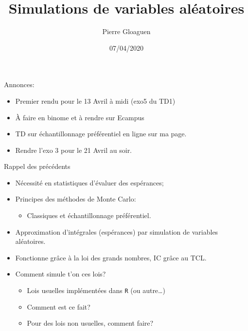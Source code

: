 \documentclass[ignorenonframetext,]{beamer}
\title{Simulations de variables aléatoires}
\author{Pierre Gloaguen}
\date{07/04/2020}
\providecommand{\tightlist}{%
  \setlength{\itemsep}{0pt}\setlength{\parskip}{0pt}}
\begin{document}
\frame{\titlepage}

\begin{frame}{Annonces:}
\protect\hypertarget{annonces}{}

\begin{itemize}
\tightlist
\item
  Premier rendu pour le 13 Avril à midi (exo5 du TD1)
\item
  À faire en binome et à rendre sur Ecampus
\item
  TD sur échantillonnage préférentiel en ligne sur ma page.
\item
  Rendre l'exo 3 pour le 21 Avril au soir.
\end{itemize}

\end{frame}

\begin{frame}[fragile]{Rappel des précédents}
\protect\hypertarget{rappel-des-pruxe9cuxe9dents}{}

\begin{itemize}
\tightlist
\item
  Nécessité en statistiques d'évaluer des espérances;
\item
  Principes des méthodes de Monte Carlo:

  \begin{itemize}
  \tightlist
  \item
    Classiques et échantillonnage préférentiel.
  \end{itemize}
\item
  Approximation d'intégrales (espérances) par simulation de variables
  aléatoires.
\item
  Fonctionne grâce à la loi des grands nombres, IC grâce au TCL.\pause
\item
  Comment simule t'on ces lois?

  \begin{itemize}
  \tightlist
  \item
    Lois usuelles implémentées dans \texttt{R} (ou autre\ldots{})
  \item
    Comment est ce fait?
  \item
    Pour des lois non usuelles, comment faire?
  \end{itemize}
\end{itemize}

\end{frame}
\end{document}
